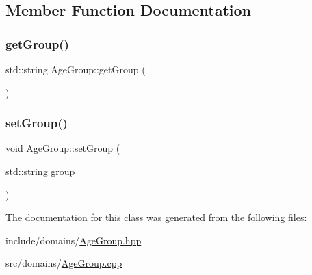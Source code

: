 \subsection{Member Function Documentation}
\mbox{\label{class_age_group_a5ed86fb98bb833c1df8ceb70c6418b4a}} 
\subsubsection{\texorpdfstring{getGroup()}{getGroup()}}
{\footnotesize\ttfamily std\+::string Age\+Group\+::get\+Group (\begin{DoxyParamCaption}{ }\end{DoxyParamCaption})}

\mbox{\label{class_age_group_a635bb5eabb52a4c7a7999935beb2909f}} 
\subsubsection{\texorpdfstring{setGroup()}{setGroup()}}
{\footnotesize\ttfamily void Age\+Group\+::set\+Group (\begin{DoxyParamCaption}\item[{std\+::string}]{group }\end{DoxyParamCaption})}



The documentation for this class was generated from the following files\+:\begin{DoxyCompactItemize}
\item 
include/domains/\mbox{\hyperlink{_age_group_8hpp}{Age\+Group.\+hpp}}\item 
src/domains/\mbox{\hyperlink{_age_group_8cpp}{Age\+Group.\+cpp}}\end{DoxyCompactItemize}
